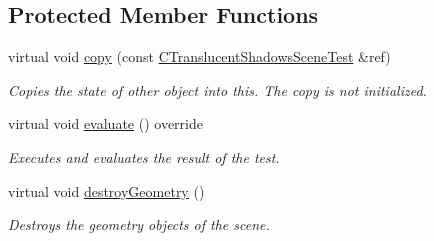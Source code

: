 \subsection*{Protected Member Functions}
\begin{DoxyCompactItemize}
\item 
\mbox{\label{class_unit_test_1_1_c_translucent_shadows_scene_test_aa94d88a33f3ddcf553cbae13682452fb}} 
virtual void \mbox{\hyperlink{class_unit_test_1_1_c_translucent_shadows_scene_test_aa94d88a33f3ddcf553cbae13682452fb}{copy}} (const \mbox{\hyperlink{class_unit_test_1_1_c_translucent_shadows_scene_test}{C\+Translucent\+Shadows\+Scene\+Test}} \&ref)
\begin{DoxyCompactList}\small\item\em Copies the state of other object into this. The copy is not initialized. \end{DoxyCompactList}\item 
\mbox{\label{class_unit_test_1_1_c_translucent_shadows_scene_test_aee38873feef58e352c30ddd16887cd08}} 
virtual void \mbox{\hyperlink{class_unit_test_1_1_c_translucent_shadows_scene_test_aee38873feef58e352c30ddd16887cd08}{evaluate}} () override
\begin{DoxyCompactList}\small\item\em Executes and evaluates the result of the test. \end{DoxyCompactList}\item 
\mbox{\label{class_unit_test_1_1_c_translucent_shadows_scene_test_ad83f0d783c6fdf501d9810653835b7a1}} 
virtual void \mbox{\hyperlink{class_unit_test_1_1_c_translucent_shadows_scene_test_ad83f0d783c6fdf501d9810653835b7a1}{destroy\+Geometry}} ()
\begin{DoxyCompactList}\small\item\em Destroys the geometry objects of the scene. \end{DoxyCompactList}\end{DoxyCompactItemize}
